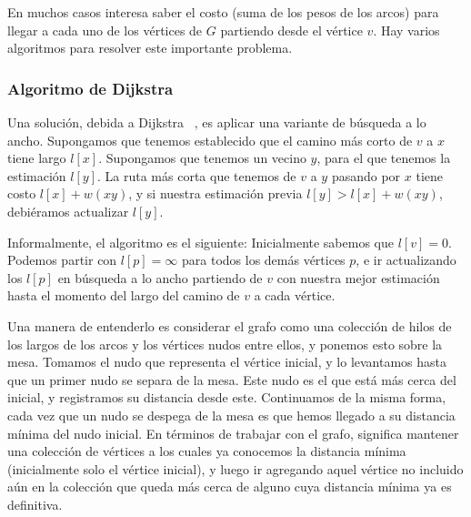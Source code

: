   En muchos casos interesa saber el costo
  (suma de los pesos de los arcos)
  para llegar a cada uno de los vértices de \(G\) partiendo desde
  el vértice \(v\).
  Hay varios algoritmos para resolver este importante problema.

\subsubsection{Algoritmo de Dijkstra}
\label{sec:Dijkstra}

  Una solución,
  debida a Dijkstra~%
   \cite{dijkstra59:_note_two_probl_connex_graph},
  es aplicar una variante de búsqueda a lo ancho.
  Supongamos que tenemos establecido que el camino más corto
  de \(v\) a \(x\) tiene largo \(l[x]\).
  Supongamos que tenemos un vecino \(y\),
  para el que tenemos la estimación \(l[y]\).
  La ruta más corta que tenemos de \(v\) a \(y\) pasando por \(x\)
  tiene costo \(l[x] + w(x y)\),
  y si nuestra estimación previa \(l[y] > l[x] + w(x y)\),
  debiéramos actualizar \(l[y]\).

  Informalmente,
  el algoritmo es el siguiente:
  Inicialmente sabemos que \(l[v] = 0\).
  Podemos partir con \(l[p] = \infty\)
  para todos los demás vértices \(p\),
  e ir actualizando los \(l[p]\)
  en búsqueda a lo ancho partiendo de \(v\)
  con nuestra mejor estimación hasta el momento
  del largo del camino de \(v\) a cada vértice.

  Una manera de entenderlo
  es considerar el grafo como una colección de hilos
  de los largos de los arcos
  y los vértices nudos entre ellos,
  y ponemos esto sobre la mesa.
  Tomamos el nudo que representa el vértice inicial,
  y lo levantamos hasta que un primer nudo se separa de la mesa.
  Este nudo es el que está más cerca del inicial,
  y registramos su distancia desde este.
  Continuamos de la misma forma,
  cada vez que un nudo se despega de la mesa
  es que hemos llegado a su distancia mínima del nudo inicial.
  En términos de trabajar con el grafo,
  significa mantener una colección de vértices
  a los cuales ya conocemos la distancia mínima
  (inicialmente solo el vértice inicial),
  y luego ir agregando aquel vértice no incluido aún en la colección
  que queda más cerca de alguno
  cuya distancia mínima ya es definitiva.

